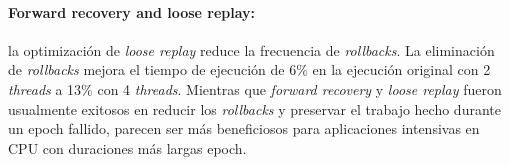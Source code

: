 \paragraph{Forward recovery and loose replay:} la optimización de \emph{loose replay} reduce la frecuencia de \emph{rollbacks}. La eliminación de \emph{rollbacks} mejora el tiempo de ejecución de 6\% en la ejecución original con 2 \emph{threads} a 13\% con 4 \emph{threads}. Mientras que \emph{forward recovery} y \emph{loose replay} fueron usualmente exitosos en reducir los \emph{rollbacks} y preservar el trabajo hecho durante un epoch fallido, parecen ser más beneficiosos para aplicaciones intensivas en CPU con duraciones más largas epoch.